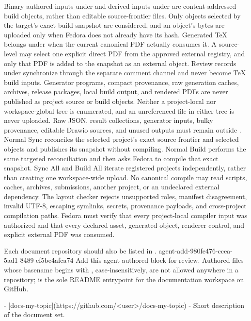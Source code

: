 {Binary authored inputs under  and derived inputs under  are content-addressed build objects, rather than editable source-frontier files.
Only objects selected by the target's exact build snapshot are considered, and an object's bytes are uploaded only when Fedora does not already have its hash.
Generated TeX belongs under  when the current canonical PDF actually consumes it.
A source-level \code{\PdfLink} may select one explicit direct PDF from the approved external registry, and only that PDF is added to the snapshot as an external object.
Review records under  synchronize through the separate comment channel and never become TeX build inputs.
Generator programs, compact provenance, raw generation caches, archives, release packages, local build output, and rendered PDFs are never published as project source or build objects.
Neither a project-local nor workspace-global  tree is enumerated, and an unreferenced file in either tree is never uploaded.
Raw JSON, result collections, generator inputs, bulky provenance, editable Drawio sources, and unused outputs must remain outside .
Normal Sync reconciles the selected project's exact source frontier and selected objects and publishes its snapshot without compiling.
Normal Build performs the same targeted reconciliation and then asks Fedora to compile that exact snapshot.
Sync All and Build All iterate registered projects independently, rather than creating one workspace-wide upload.
No canonical compile may read scripts, caches, archives, submissions, another project, or an undeclared external dependency.
The layout checker rejects unsupported  roles, manifest disagreement, invalid UTF-8, escaping symlinks, secrets, provenance payloads, and cross-project compilation paths.
Fedora must verify that every project-local compiler input was authorized and that every declared asset, generated object, renderer control, and explicit external PDF was consumed.}

Each document repository should also be listed in .
\agentProposedEdit
  {agent-add-980fe476-ccea-5ad1-8489-ef5be4afca74}
  {Add this agent-authored block for review.}
  {}
  {Authored files whose basename begins with , case-insensitively, are not allowed anywhere in a  repository;  is the sole README entrypoint for the documentation workspace on GitHub.}
\begin{DocCode}
- [docs-my-topic](https://github.com/<user>/docs-my-topic) - Short description of the document set.
\end{DocCode}

